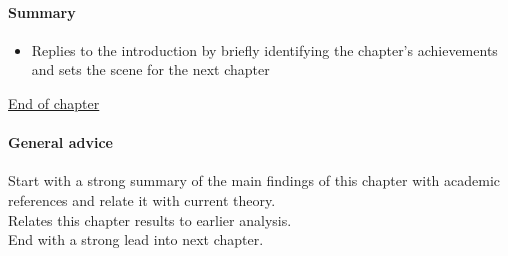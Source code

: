 \documentclass[dissertation,final]{softeng}
\begin{document}
\paragraph{Summary}
\begin{itemize}
\item Replies to the introduction by briefly identifying the chapter's achievements and sets the scene for the next chapter
\end{itemize}

\noindent\underline{End of chapter}
\paragraph{General advice}
Start with a strong summary of the main findings of this chapter with academic references and relate it with current theory.\\
Relates this chapter results to earlier analysis.\\
End with a strong lead into next chapter.\\

\printbibliography
\end{document}
